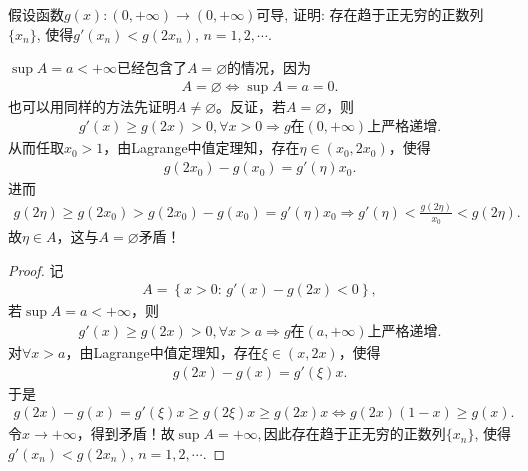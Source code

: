 \documentclass[../../main.tex]{subfiles}%
\begin{document}
\begin{example}
假设函数$g(x): (0,+\infty) \to (0,+\infty)$可导, 证明: 存在趋于正无穷的正数列$\{x_n\}$, 使得$g'(x_n) < g(2x_n)$, $n=1,2,\cdots$.
\end{example}
\begin{remark}
$\sup A=a<+\infty$已经包含了$A=\varnothing$的情况，因为
\begin{align*}
A=\varnothing \Longleftrightarrow \sup A=a=0.
\end{align*}
也可以用同样的方法先证明$A\ne \varnothing$。反证，若$A=\varnothing$，则
\begin{align*}
g'(x) \geqslant g(2x) >0,\forall x>0\Longrightarrow g\text{在}(0,+\infty)\text{上严格递增}.
\end{align*}
从而任取$x_0>1$，由Lagrange中值定理知，存在$\eta \in (x_0,2x_0)$，使得
\begin{align*}
g(2x_0)-g(x_0)=g'(\eta)x_0.
\end{align*}
进而
\begin{align*}
g(2\eta) \geqslant g(2x_0) > g(2x_0)-g(x_0)=g'(\eta)x_0 \Longrightarrow g'(\eta) < \frac{g(2\eta)}{x_0}<g(2\eta).
\end{align*}
故$\eta \in A$，这与$A=\varnothing$矛盾！
\end{remark}
\begin{proof}

记
\begin{align*}
A=\left\{ x>0:\,g'(x)-g(2x) <0 \right\},
\end{align*}
若$\sup A=a<+\infty$，则
\begin{align*}
g'(x) \geqslant g(2x) >0,\forall x>a\Longrightarrow g\text{在}(a,+\infty)\text{上严格递增}.
\end{align*}
对$\forall x>a$，由Lagrange中值定理知，存在$\xi \in (x,2x)$，使得
\begin{align*}
g(2x)-g(x)=g'(\xi)x.
\end{align*}
于是
\begin{align*}
g(2x)-g(x)=g'(\xi)x \geqslant g(2\xi)x \geqslant g(2x)x \Longleftrightarrow g(2x)(1-x) \geqslant g(x).
\end{align*}
令$x\rightarrow +\infty$，得到矛盾！故$\sup A=+\infty,$因此存在趋于正无穷的正数列$\{x_n\}$, 使得$g'(x_n) < g(2x_n)$, $n=1,2,\cdots$.

\end{proof}
\end{document}
